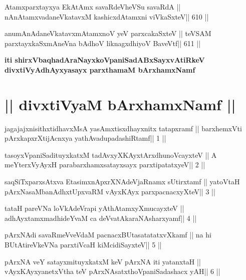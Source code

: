 \begin{shl}
Atamxparxtayxya EkAtAmx savaRdeVheVSu savaRdA ||
nAnAtamxvadaneVkatavxM kashicxdAtamxni viVkaSxteV\hfill || 610 ||
\end{shl}

\begin{shl}
anumAnAdaneVkatavxmAtamxnoV yeV parxcakaSxteV ||
teVSAM parxtayxkaSxmAneVna bAdhoV liknagxdhiyoV BaveVtf\hfill || 611 ||
\end{shl}

\begin{center}
{\bf iti shirxVbaqhadAraNayxkoVpaniSadABxSayxvAtiRkeV\\ 
divxtiVyAdhAyxyasayx parxthamaM bArxhamxNamf}
\end{center}

\section{|| divxtiVyaM bArxhamxNamf ||}

\begin{shl}
jagajajxnisithxtidhavxMsA yasAmxtisxdhayxnitx tatapxramf ||
barxhemxVti pArxkapxrXtijAcnxya yathAvadupadashiRtamf\hfill || 1 ||
\end{shl}

\begin{shl}
tasoyxVpaniSadituyxkatxM tadAvxyXKAyx\s tArxdhunoVcayxteV ||
A meYterxVyAyxH parabarxhamxsatayxsayx parxtipatatxyeV\hfill || 2 ||
\end{shl}

\begin{shl}
saqSiTxparxsAtxva EtasimxnApxrXNAdeVjaRnamx sUtirxtamf ||
yatoV\s taH pArxNasaMbanAdhxtUpxvaRM vAyxKAyx parxpacnacxyXteV\hfill || 3 ||
\end{shl}

\begin{shl}
tataH pareVNa loVkAdeVrapi yAthAtamxyXmucayxteV ||
adhAyxtamxmadhideYvaM ca deVvatAkaraNAsharxyamf\hfill || 4 ||
\end{shl}

\begin{shl}
pArxNAdi savaRmeVveVdaM pacnacxBUtasatatatxvXkamf ||
na hi BUtAtireVkeVNa parxtiVcaH kiMcidiSayxteV\hfill || 5 ||
\end{shl}

\begin{shl}
pArxNA veY satayxmituyxkatxM keV pArxNA iti yatanxtaH ||
vAyxKAyxyanetxV\s tha teV pArxNAsatxthoVpaniSadashacx yAH\hfill || 6 ||
\end{shl}

